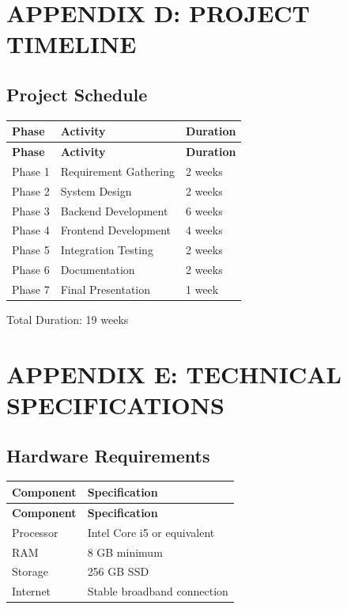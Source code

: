 \documentclass[12pt,a4paper]{book}
\numberwithin{table}{chapter}
\numberwithin{figure}{chapter}
\numberwithin{equation}{chapter}
\begin{document}
\begin{figure}[h]
\end{figure}

\chapter{APPENDIX D: PROJECT TIMELINE}

\section{Project Schedule}

\begin{longtable}{|p{1.5in}|p{2in}|p{2in}|}
\hline
\textbf{Phase} & \textbf{Activity} & \textbf{Duration}\\
\hline
\endfirsthead
\hline
\textbf{Phase} & \textbf{Activity} & \textbf{Duration}\\
\hline
\endhead
\hline
Phase 1 & Requirement Gathering & 2 weeks\\
\hline
Phase 2 & System Design & 2 weeks\\
\hline
Phase 3 & Backend Development & 6 weeks\\
\hline
Phase 4 & Frontend Development & 4 weeks\\
\hline
Phase 5 & Integration Testing & 2 weeks\\
\hline
Phase 6 & Documentation & 2 weeks\\
\hline
Phase 7 & Final Presentation & 1 week\\
\hline
\end{longtable}

\bigskip
Total Duration: 19 weeks

\chapter{APPENDIX E: TECHNICAL SPECIFICATIONS}

\section{Hardware Requirements}

\begin{longtable}{|p{2in}|p{4in}|}
\hline
\textbf{Component} & \textbf{Specification}\\
\hline
\endfirsthead
\hline
\textbf{Component} & \textbf{Specification}\\
\hline
\endhead
\hline
Processor & Intel Core i5 or equivalent\\
\hline
RAM & 8 GB minimum\\
\hline
Storage & 256 GB SSD\\
\hline
Internet & Stable broadband connection\\
\hline
\end{longtable}
\end{document}
